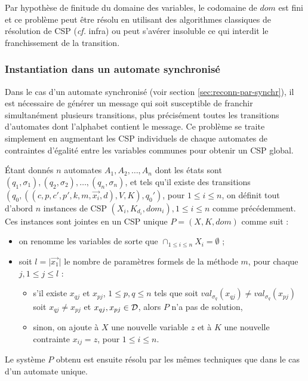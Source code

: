 Par hypoth\`ese de finitude du domaine des variables, le codomaine de
$dom$ est fini et ce probl\`eme peut \^etre r\'esolu en utilisant
des algorithmes classiques de r\'esolution de CSP (\emph{cf.} infra) ou
peut s'av\'erer insoluble ce qui interdit le franchissement de la transition.

\subsubsection{Instantiation dans un automate synchronis\'e}

Dans le cas d'un automate synchronis\'e  (voir section \ref{sec:reconn-par-synchr}), il
est n\'ecessaire de g\'en\'erer un message qui soit susceptible de
franchir simultan\'ement plusieurs transitions, plus
pr\'ecis\'ement toutes les transitions d'automates dont l'alphabet
contient le message. Ce probl\`eme se traite simplement en augmentant
les CSP individuels de chaque automates de contraintes d'\'egalit\'e
entre les variables communes pour obtenir un CSP global.

\'Etant donn\'es $n$ automates $A_1,A_2,\dots,A_n$ dont les \'etats sont
$(q_1,\sigma_1),(q_2,\sigma_2),\dots,(q_n,\sigma_n)$, et tels qu'il
existe des  transitions $(q_0,((c,p,c',p',k,
m,\vec{x_i},d),V,K),q_0')$, pour $1 \leq i\leq n$, on d\'efinit tout
d'abord  $n$ instances de  CSP $(X_i,K_{d_i},dom_i), 1
\leq i\leq n$ comme pr\'ec\'edemment. Ces instances sont jointes en
un CSP unique $P=(X,K,dom)$ comme suit :
\begin{itemize}
  \item on renomme les variables de sorte que
  $\cap_{1\leq i \leq n} X_i = \emptyset$ ;
\item soit $l = \vert\vec{x_1}\vert$ le nombre de param\`etres
  formels de la m\'ethode $m$, pour chaque $j, 1\leq j \leq l$ :
  \begin{itemize}
    \item s'il existe $x_{qj}$ et $x_{pj}$, $1\leq p,q \leq n$
    tels que soit $val_{\sigma_q}(x_{qj}) \neq
    val_{\sigma_q}(x_{pj})$ soit $x_{qj}\neq x_{pj}$ et  $x_{qj},x_{pj}
    \in  {\cal D}$, alors  $P$ n'a pas de solution,
  \item sinon, on ajoute \`a $X$ une nouvelle variable  $z$ et \`a  $K$
    une nouvelle contrainte $x_{ij} = z$, pour  $1\leq i \leq n$.
  \end{itemize}
\end{itemize}

Le syst\`eme  $P$ obtenu est ensuite r\'esolu par les m\^emes
techniques que dans le cas d'un automate unique.

